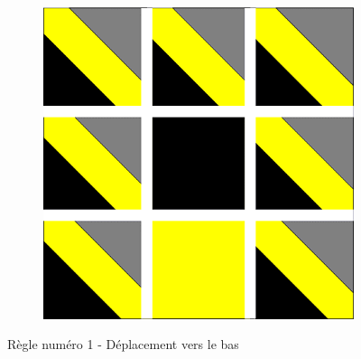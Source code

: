 \documentclass[a4paper]{article}
\begin{document}
\begin{figure}[!h]
\begin{subfigure}[t]{0.17\textwidth}
    \end{subfigure}
    \hfill
    \begin{subfigure}[t]{0.17\textwidth}
        \includegraphics[width=\textwidth]{img/rule11.png}
    \end{subfigure}
    \caption{Règle numéro 1 - Déplacement vers le bas}
\end{figure}
\end{document}
